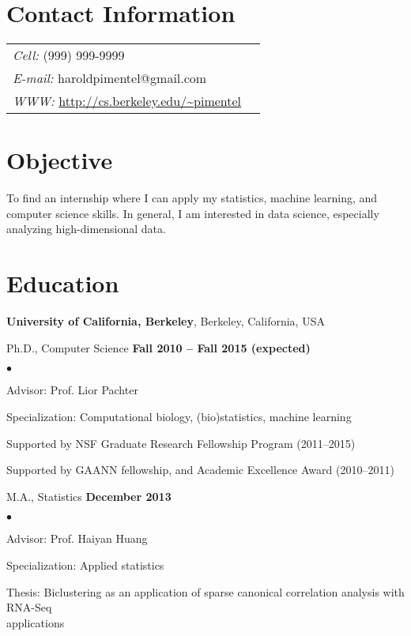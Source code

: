 \documentclass[margin,line]{res}
\newenvironment{list2}{
  \begin{list}{$\bullet$}{%
      \setlength{\itemsep}{0in}
      \setlength{\parsep}{0in} \setlength{\parskip}{0in}
      \setlength{\topsep}{0in} \setlength{\partopsep}{0in}
      \setlength{\leftmargin}{0.2in}}}{\end{list}}
\begin{document}

\begin{resume}
\section{\sc Contact Information}
\vspace{.05in}
\begin{tabular}{@{}p{4in}p{2in}}
 {\it Cell:}  (999) 999-9999 & \\
 {\it E-mail:}  haroldpimentel@gmail.com & \\
 {\it WWW:} \url{http://cs.berkeley.edu/~pimentel} &
\end{tabular}

\section{\sc Objective}
To find an internship where I can apply my statistics, machine learning, and
computer science skills. In general, I am interested in data science, especially
analyzing high-dimensional data.

\section{\sc Education}
{\bf University of California, Berkeley}, Berkeley, California, USA

\vspace{-.3cm}
Ph.D., Computer Science \hfill {\bf
  Fall 2010 -- Fall 2015 (expected) }\\
\vspace{-.45cm}
\begin{list2}
  \vspace*{1mm}
\item Advisor: Prof. Lior Pachter
\item Specialization: Computational biology, (bio)statistics, machine learning
\item Supported by NSF Graduate Research Fellowship Program (2011--2015)
\item Supported by GAANN fellowship, and Academic Excellence Award (2010--2011)
\end{list2}

M.A., Statistics \hfill {\bf
 December 2013}\\
\vspace{-.45cm}
\begin{list2}
\vspace*{1mm}
\item Advisor: Prof. Haiyan Huang
\item Specialization: Applied statistics
\item Thesis: Biclustering as an application of sparse canonical correlation analysis with RNA-Seq \\applications
\end{list2}


\end{resume}
\end{document}
